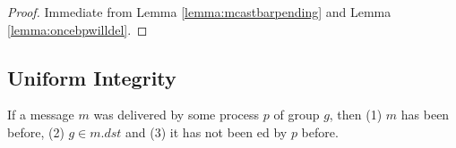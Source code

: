 \documentclass[times, 10pt]{article}
\begin{document}
\begin{proof}
Immediate from Lemma \ref{lemma:mcastbarpending} and Lemma \ref{lemma:oncebpwilldel}.%
\end{proof}





\subsection{Uniform Integrity}





\begin{props} \label{props:integrity}
If a message $m$ was delivered by some process $p$ of group $g$, then (1) $m$ has been \amcast{} before, (2) $g \in m.dst$ and (3) it has not been \amdel{}ed by $p$ before.
\end{props}
\end{document}
